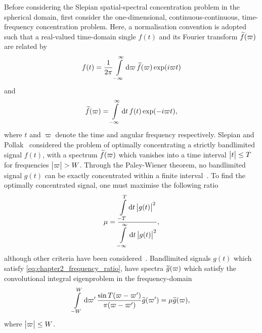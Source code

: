 Before considering the Slepian spatial-spectral concentration problem in the spherical domain, first consider the one-dimensional, continuous-continuous, time-frequency concentration problem.
Here, a normalisation convention is adopted such that a real-valued time-domain single \(f(t)\) and its Fourier transform \(\widetilde{f}(\varpi)\) are related by
%
\begin{equation}\label{eq:chapter2_fourier_time}
	f(t)
	= \frac{1}{2\pi} \int\limits_{-\infty}^{\infty} \dd{\varpi} \widetilde{f}(\varpi) \exp(i\varpi t)
\end{equation}
%
and
%
\begin{equation}\label{eq:chapter2_fourier_frequency}
	\widetilde{f}(\varpi)
	= \int\limits_{-\infty}^{\infty} \dd{t} f(t) \exp(-i\varpi t),
\end{equation}
%
where \(t\) and \(\varpi{}\) denote the time and angular frequency respectively.
Slepian and Pollak~\cite{Slepian1961} considered the problem of optimally concentrating a strictly bandlimited signal \(f(t)\), with a spectrum \(\widetilde{f}(\varpi)\) which vanishes into a time interval \(\big\lvert t\big\rvert \leq T\) for frequencies \(\big\lvert\varpi\big\rvert > W\).
Through the Paley-Wiener theorem, no bandlimited signal \(g(t)\) can be exactly concentrated within a finite interval~\cite{Daubechies1992,Mallat2008}.
To find the optimally concentrated signal, one must maximise the following ratio
%
\begin{equation}\label{eq:chapter2_frequency_ratio}
	\mu
	= \frac{\displaystyle\int\limits_{-T}^{T} \dd{t} \big\lvert g(t)\big\rvert^{2}}
	{\displaystyle\int\limits_{-\infty}^{\infty} \dd{t} \big\lvert g(t)\big\rvert^{2}},
\end{equation}
%
although other criteria have been considered~\cite{Freeden1997,Riedel1995}.
Bandlimited signals \(g(t)\) which satisfy \cref{eq:chapter2_frequency_ratio}, have spectra \(\widetilde{g}(\varpi)\) which satisfy the convolutional integral eigenproblem in the frequency-domain
%
\begin{equation}\label{eq:chapter2_frequency_eigenproblem}
	\int\limits_{-W}^{W} \dd{\varpi'} \frac{\sin{T(\varpi-\varpi')}}{\pi(\varpi-\varpi')} \widetilde{g}(\varpi')
	= \mu \widetilde{g}(\varpi),
\end{equation}
%
where \(\big\lvert\varpi\big\rvert \leq W\).

